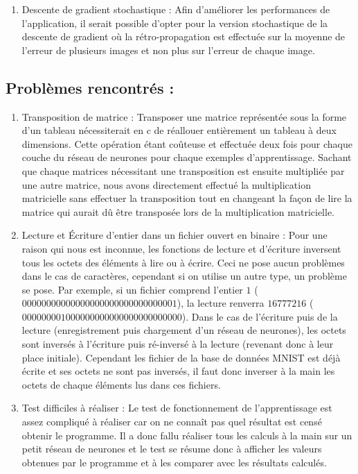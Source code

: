\documentclass{article}
\begin{document}
\begin{enumerate}
\begin{center}
				\end{center}
			\item Descente de gradient stochastique :
			Afin d'améliorer les performances de l'application, il serait possible d'opter pour la version stochastique de la descente de gradient où la rétro-propagation est effectuée sur la moyenne de l'erreur de plusieurs images et non plus sur l'erreur de chaque image.
	\end{enumerate}

\subsection{Problèmes rencontrés :}
	\begin{enumerate}
			\item Transposition de matrice :
			Transposer une matrice représentée sous la forme d'un tableau nécessiterait en c de réallouer entièrement un tableau à deux dimensions. Cette opération étant coûteuse et effectuée deux fois pour chaque couche du réseau de neurones pour chaque exemples d'apprentissage. Sachant que chaque matrices nécessitant une transposition est ensuite multipliée par une autre matrice, nous avons directement effectué la multiplication matricielle sans effectuer la transposition tout en changeant la façon de lire la matrice qui aurait dû être transposée lors de la multiplication matricielle.
			\item Lecture et Écriture d'entier dans un fichier ouvert en binaire : 
			Pour une raison qui nous est inconnue, les fonctions de lecture et d'écriture inversent tous les octets des éléments à lire ou à écrire. Ceci ne pose aucun problèmes dans le cas de caractères, cependant si on utilise un autre type,  un problème se pose. Par exemple, si un fichier comprend l'entier $1$ ($00000000000000000000000000000001$), la lecture renverra $16777216$ ($000000001000000000000000000000000$). Dans le cas de l'écriture puis de la lecture (enregistrement puis chargement d'un réseau de neurones), les octets sont inversés à l'écriture puis ré-inversé à la lecture (revenant donc à leur place initiale).
Cependant les fichier de la base de données MNIST est déjà écrite et ses octets ne sont pas inversés, il faut donc inverser à la main les octets de chaque éléments lus dans ces fichiers.
			\item Test difficiles à réaliser :
			Le test de fonctionnement de l'apprentissage est assez compliqué à réaliser car on ne connaît pas quel résultat est censé obtenir le programme. Il a donc fallu réaliser tous les calculs à la main sur un petit réseau de neurones et le test se résume donc à afficher les valeurs obtenues par le programme et à les comparer avec les résultats calculés.

\end{enumerate}
\end{document}
